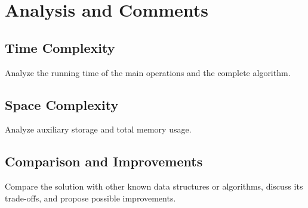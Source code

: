\section{Analysis and Comments}

\subsection{Time Complexity}

Analyze the running time of the main operations and the complete algorithm.

\subsection{Space Complexity}

Analyze auxiliary storage and total memory usage.

\subsection{Comparison and Improvements}

Compare the solution with other known data structures or algorithms, discuss
its trade-offs, and propose possible improvements.
